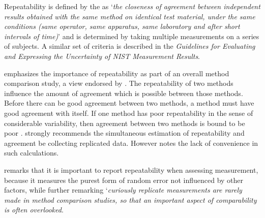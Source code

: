 \documentclass[12pt, a4paper]{report}
\theoremstyle{plain}
\theoremstyle{definition}
\theoremstyle{remark}
\begin{document}
		Repeatability is defined by the \citet{IUPAC} as `\textit{the closeness of agreement between independent results obtained with the same method on identical test material, under the same conditions (same
			operator, same apparatus, same laboratory and after short intervals of time)}'  and is determined by taking multiple measurements on a series of subjects.	A similar set of criteria is described in the \textit{Guidelines for Evaluating and Expressing the Uncertainty of NIST Measurement Results}.
%		



\citet{Barnhart} emphasizes the importance of repeatability as part of an overall method comparison study, a view endorsed by \citet{BXC2008}. The repeatability of two methods influence the amount of agreement which is possible between those methods. Before there can be good agreement between two methods, a method must have good agreement with itself. If one method has poor repeatability in the sense of considerable variability, then agreement between two methods is bound to be poor \citep{Ba99, ARoy2009}.
\citet{BA99} strongly recommends the simultaneous estimation of repeatability and agreement be collecting replicated data.
However \citet{ARoy2009} notes the lack of convenience in such calculations. 

% 

	

	\citet{Barnhart} remarks that it is important to report repeatability when assessing
	measurement, because it measures the purest form of random error
	not influenced by other factors, while further remarking `\textit{curiously replicate measurements are rarely made in method comparison studies, so that an important aspect of comparability is often overlooked}. 
	
\end{document}
